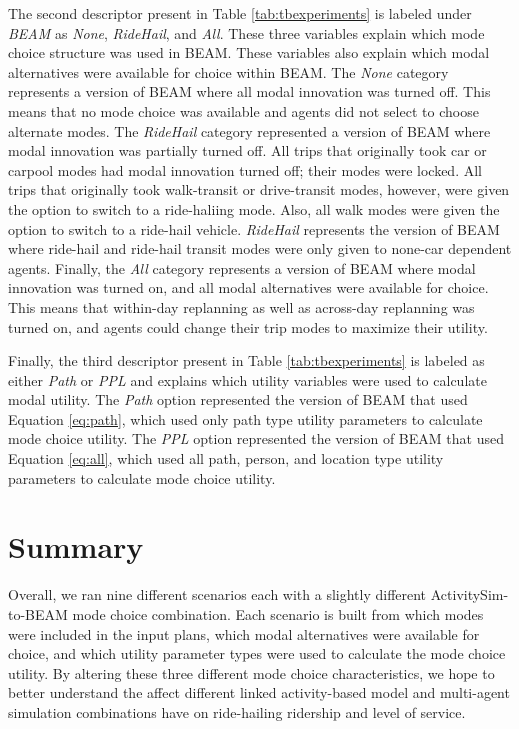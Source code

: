 \documentclass[fancy, masters]{byuthesis}
\begin{document}
The second descriptor present in Table \ref{tab:tbexperiments} is labeled under \emph{BEAM} as \emph{None}, \emph{RideHail}, and \emph{All}. These three variables explain which mode choice structure was used in BEAM. These variables also explain which modal alternatives were available for choice within BEAM. The \emph{None} category represents a version of BEAM where all modal innovation was turned off. This means that no mode choice was available and agents did not select to choose alternate modes. The \emph{RideHail} category represented a version of BEAM where modal innovation was partially turned off. All trips that originally took car or carpool modes had modal innovation turned off; their modes were locked. All trips that originally took walk-transit or drive-transit modes, however, were given the option to switch to a ride-haliing mode. Also, all walk modes were given the option to switch to a ride-hail vehicle. \emph{RideHail} represents the version of BEAM where ride-hail and ride-hail transit modes were only given to none-car dependent agents. Finally, the \emph{All} category represents a version of BEAM where modal innovation was turned on, and all modal alternatives were available for choice. This means that within-day replanning as well as across-day replanning was turned on, and agents could change their trip modes to maximize their utility.

Finally, the third descriptor present in Table \ref{tab:tbexperiments} is labeled as either \emph{Path} or \emph{PPL} and explains which utility variables were used to calculate modal utility. The \emph{Path} option represented the version of BEAM that used Equation \eqref{eq:path}, which used only path type utility parameters to calculate mode choice utility. The \emph{PPL} option represented the version of BEAM that used Equation \eqref{eq:all}, which used all path, person, and location type utility parameters to calculate mode choice utility.

\hypertarget{summary-1}{%
\section{Summary}\label{summary-1}}

Overall, we ran nine different scenarios each with a slightly different ActivitySim-to-BEAM mode choice combination. Each scenario is built from which modes were included in the input plans, which modal alternatives were available for choice, and which utility parameter types were used to calculate the mode choice utility. By altering these three different mode choice characteristics, we hope to better understand the affect different linked activity-based model and multi-agent simulation combinations have on ride-hailing ridership and level of service.
\end{document}
